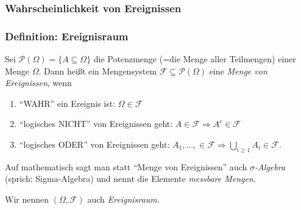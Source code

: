 \begin{frame}
  \frametitle{Wahrscheinlichkeit von Ereignissen}


\vspace{0.6cm}


\vspace{0.6cm}

\end{frame}

\begin{frame}
  \frametitle{Definition: Ereignisraum}

  Sei $\mathcal{P}(\Omega) = \{A \subseteq \Omega\}$ die Potenzmenge (=die Menge aller Teilmengen) einer Menge $\Omega$. Dann heißt ein Mengensystem $\mathcal{F} \subseteq \mathcal{P}(\Omega)$ eine \emph{Menge von Ereignissen}, wenn
  \begin{enumerate}
  \item ``WAHR'' ein Ereignis ist: $\Omega \in \mathcal{F}$
  \item ``logisches NICHT'' von Ereignissen geht: $A \in \mathcal{F} \Rightarrow A^c \in \mathcal{F}$
  \item ``logisches ODER'' von Ereignissen geht: $A_1,\dots, \in \mathcal{F} \Rightarrow \bigcup_{i\geq 1} A_i \in \mathcal{F}$.
  \end{enumerate}

  \vspace{0.6cm}
  
  Auf mathematisch sagt man statt ``Menge von Ereignissen'' auch \emph{$\sigma$-Algebra} (sprich: Sigma-Algebra) und nennt die Elemente \emph{messbare Mengen}.
  
  Wir nennen $(\Omega, \mathcal{F})$ auch \emph{Ereignisraum}.
\end{frame}

